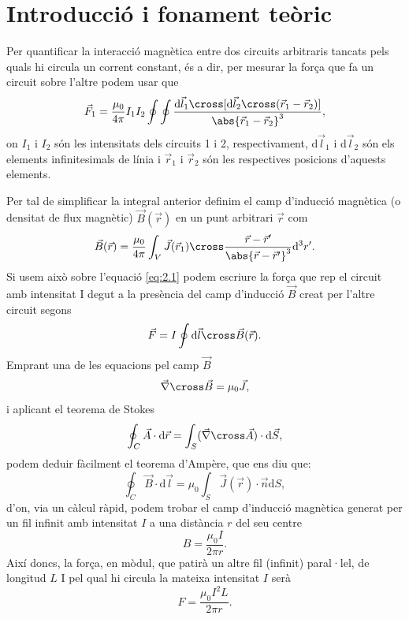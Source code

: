 \documentclass[a4paper,10.5pt]{report}
\begin{document}
\section{Introducció i fonament teòric}
Per quantificar la interacció magnètica entre dos circuits arbitraris tancats pels quals hi circula un corrent constant, és a dir, per mesurar la força que fa un circuit sobre l'altre podem usar que
\begin{equation}
	\vec{F}_1 = \frac{\mu_0}{4\pi}I_1I_2\oint \oint \frac{\mathrm{d}\vec{l}_1\cross[\mathrm{d}\vec{l}_2 \cross (\vec{r}_1-\vec{r}_2)]}{\abs{\vec{r}_1 - \vec{r}_2}^3}\label{eq:2.1},
\end{equation}
on $I_1$ i $I_2$ són les intensitats dels circuits 1 i 2, respectivament, d$\vec{l}_1$ i d$\vec{l}_2$ són els elements infinitesimals de línia i $\vec{r}_1$ i $\vec{r}_2$ són les respectives posicions d'aquests elements.

Per tal de simplificar la integral anterior definim el camp d'inducció magnètica (o densitat de flux magnètic) $\vec{B}(\vec{r})$ en un punt arbitrari $\vec{r}$ com
\begin{equation}
	\vec{B}(\vec{r}) = \frac{\mu_0}{4\pi} \int_V \vec{J}(\vec{r}_1)\cross\frac{\vec{r}-\vec{r}'}{\abs{\vec{r}-\vec{r}'}^3}\mathrm{d}^3r'.
\end{equation} 
Si usem això sobre l'equació \eqref{eq:2.1} podem escriure la força que rep el circuit amb intensitat I degut a la presència del camp d'inducció $\vec{B}$ creat per l'altre circuit segons
\begin{equation}
	\vec{F} = I \oint \mathrm{d}\vec{l}\cross\vec{B}(\vec{r}).
\end{equation}
Emprant una de les equacions pel camp $\vec{B}$
\begin{equation}
	\vec{\nabla}\cross \vec{B} = \mu_0 \vec{J},
\end{equation}
i aplicant el teorema de Stokes
\begin{equation}
	\oint_C \vec{A} \cdot \mathrm{d}\vec{r} = \int_S (\vec{\nabla}\cross \vec{A})\cdot \mathrm{d}\vec{S},
\end{equation}
podem deduir fàcilment el teorema d'Ampère, que ens diu que:
\begin{equation}
	\oint_C\vec{B}\cdot\mathrm{d}\vec{l} = \mu_0\int_S\vec{J}(\vec{r})\cdot\vec{n}\mathrm{d}S,
\end{equation}
d'on, via un càlcul ràpid, podem trobar el camp d'inducció magnètica generat per un fil infinit amb intensitat $I$ a una distància $r$ del seu centre
\begin{equation}
	B = \frac{\mu_0 I}{2\pi r}. \label{eq2:7}
\end{equation}
Així doncs, la força, en mòdul, que patirà un altre fil (infinit) paral·lel, de longitud $L$ I pel qual hi circula la mateixa intensitat $I$ serà
\begin{equation}
	F = \frac{\mu_0 I^2L}{2\pi r}. \label{eq2:8}
\end{equation} 
\end{document}
